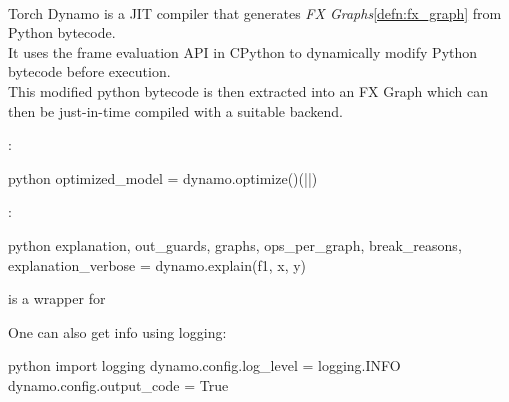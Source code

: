 \begin{defnbox}\nospacing
    \begin{defn}\label{defn:torch_dynamo}\leavevmode\\
        Torch Dynamo is a JIT compiler that generates \textit{FX Graphs}\cref{defn:fx_graph} from Python bytecode.\\
        It uses the frame evaluation API in CPython to dynamically modify Python bytecode before execution.\\
        This modified python bytecode is then extracted into an FX Graph which can then be just-in-time compiled with a suitable backend.
        \begin{figure}[H]
            \vspace{-1em}
            \centering{
              \def\svgwidth{200pt}
              \resizebox{\linewidth}{!}{}
            }
        \end{figure}
        :
        \begin{mintlinebox}{python}
            optimized_model = dynamo.optimize()(|\texttt{}|)
        \end{mintlinebox}
        :
        \begin{mintlinebox}{python}
            explanation, out_guards, graphs, ops_per_graph,
            break_reasons, explanation_verbose
            = dynamo.explain(f1, x, y)
        \end{mintlinebox}
    \end{defn}
\end{defnbox}
\begin{notebox}[Notes]\nospacing
    \begin{itemizenosep}
        \item {} is a wrapper for 
        \item One can also get info using logging:
    \begin{plaincodebox}[colback=notebox]{python}
        import logging
        dynamo.config.log_level = logging.INFO
        dynamo.config.output_code = True
    \end{plaincodebox}
    \end{itemizenosep}
\end{notebox}
